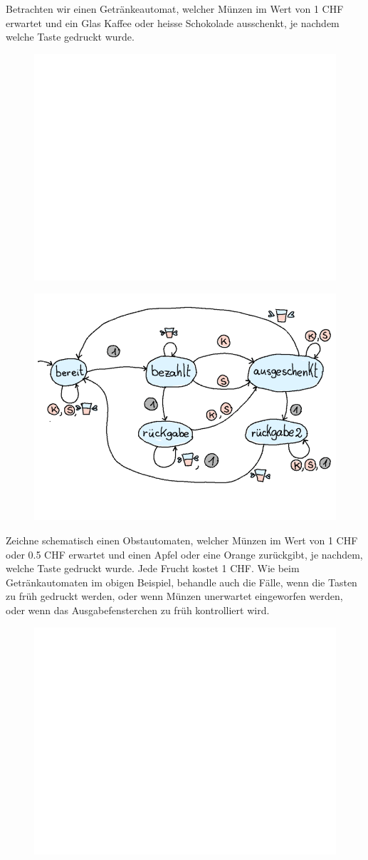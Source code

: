 \documentclass{article}
\begin{document}
\begin{example}
Betrachten wir einen Getränkeautomat, welcher Münzen im Wert von 1 CHF erwartet und ein Glas Kaffee oder heisse Schokolade ausschenkt, je nachdem welche Taste gedruckt wurde.
\begin{figure}[H]
\centering
\includegraphics[width=0.6\linewidth]{Pictures/weiss.png} 
\end{figure}
\end{example}

\begin{examplesolution}
\begin{figure}[H]
\centering
\includegraphics[width=0.6\linewidth]{Pictures/Getraenkeautomat.png} 
\end{figure}
\end{examplesolution}

\begin{question}
Zeichne schematisch einen Obstautomaten, welcher Münzen im Wert von 1 CHF oder 0.5 CHF erwartet und einen Apfel oder eine Orange zurückgibt, je nachdem, welche Taste gedruckt wurde. Jede Frucht kostet 1 CHF. Wie beim Getränkautomaten im obigen Beispiel, behandle auch die Fälle, wenn die Tasten zu früh gedruckt werden, oder wenn Münzen unerwartet eingeworfen werden, oder wenn das Ausgabefensterchen zu früh kontrolliert wird.
\begin{figure}[H]
\centering
\includegraphics[width=0.6\linewidth]{Pictures/weiss.png} 
\end{figure}
\end{question}
\end{document}
